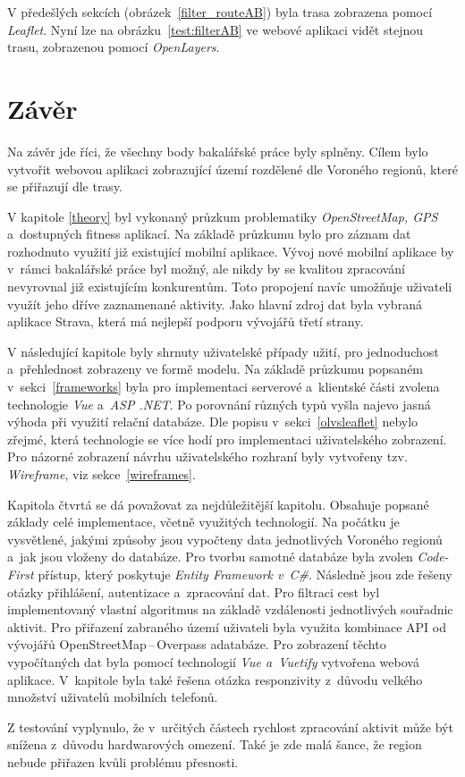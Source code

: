 V předešlých sekcích (obrázek~\ref{filter_routeAB}) byla trasa zobrazena pomocí \emph{Leaflet}. Nyní lze na obrázku~\ref{test:filterAB} ve webové aplikaci vidět stejnou trasu, zobrazenou pomocí \emph{OpenLayers}.

\chapter{Závěr}
Na závěr jde říci, že všechny body bakalářské práce byly splněny. Cílem bylo vytvořit webovou aplikaci zobrazující území rozdělené dle Voroného regionů, které se přiřazují dle trasy. 

V kapitole \ref{theory} byl vykonaný průzkum problematiky \emph{OpenStreetMap, GPS} a~dostupných fitness aplikací. Na základě průzkumu bylo pro záznam dat rozhodnuto využití již existující mobilní aplikace. Vývoj nové mobilní aplikace by v~rámci bakalářské práce byl možný, ale nikdy by se kvalitou zpracování nevyrovnal již existujícím konkurentům. Toto propojení navíc umožňuje uživateli využít jeho dříve zaznamenané aktivity. Jako hlavní zdroj dat byla vybraná aplikace Strava, která má nejlepší podporu vývojářů třetí strany. 

V následující kapitole byly shrnuty uživatelské případy užití, pro jednoduchost a~přehlednost zobrazeny ve formě modelu. Na základě průzkumu popsaném v~sekci~\ref{frameworks} byla pro implementaci serverové a~klientské části zvolena technologie \emph{Vue} a~\emph{ASP .NET}. Po porovnání různých typů vyšla najevo jasná výhoda při využití relační databáze. Dle popisu v~sekci~\ref{olvsleaflet} nebylo zřejmé, která technologie se více hodí pro implementaci uživatelského zobrazení. Pro názorné zobrazení návrhu uživatelského rozhraní byly vytvořeny tzv. \emph{Wireframe}, viz sekce~\ref{wireframes}.

Kapitola čtvrtá se dá považovat za nejdůležitější kapitolu. Obsahuje popsané základy celé implementace, včetně využitých technologií. Na počátku je vysvětlené, jakými způsoby jsou vypočteny data jednotlivých Voroného regionů a~jak jsou vloženy do databáze. Pro tvorbu samotné databáze byla zvolen \emph{Code-First} přístup, který poskytuje \emph{Entity Framework v~C\#}. Následně jsou zde řešeny otázky přihlášení, autentizace a~zpracování dat. Pro filtraci cest byl implementovaný vlastní algoritmus na základě vzdálenosti jednotlivých souřadnic aktivit. Pro přiřazení zabraného území uživateli byla využita kombinace API od vývojářů OpenStreetMap\,--\,Overpass adatabáze. Pro zobrazení těchto vypočítaných dat byla pomocí technologií \emph{Vue a~Vuetify} vytvořena webová aplikace. V~kapitole byla také řešena otázka responzivity z~důvodu velkého množství uživatelů mobilních telefonů. 

Z testování vyplynulo, že v~určitých částech rychlost zpracování aktivit může být snížena z~důvodu hardwarových omezení. Také je zde malá šance, že region nebude přiřazen kvůli problému přesnosti.
\label{webapp}
